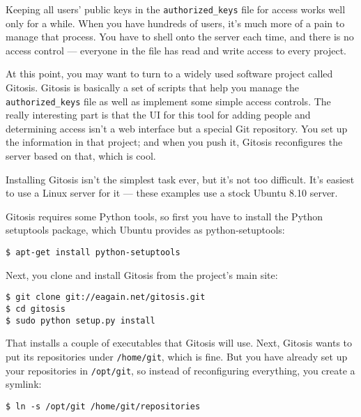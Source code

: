 \documentclass[a4paper]{book}
\newcounter{tab}[chapter]
\begin{document}
Keeping all users' public keys in the \texttt{authorized\_keys} file for access works well only for a while. When you have hundreds of users, it's much more of a pain to manage that process. You have to shell onto the server each time, and there is no access control --- everyone in the file has read and write access to every project.

At this point, you may want to turn to a widely used software project called Gitosis. Gitosis is basically a set of scripts that help you manage the \texttt{authorized\_keys} file as well as implement some simple access controls. The really interesting part is that the UI for this tool for adding people and determining access isn't a web interface but a special Git repository. You set up the information in that project; and when you push it, Gitosis reconfigures the server based on that, which is cool.

Installing Gitosis isn't the simplest task ever, but it's not too difficult. It's easiest to use a Linux server for it --- these examples use a stock Ubuntu 8.10 server.

Gitosis requires some Python tools, so first you have to install the Python setuptools package, which Ubuntu provides as python-setuptools:

\begin{shaded}\begin{verbatim}
$ apt-get install python-setuptools
\end{verbatim}\end{shaded}

Next, you clone and install Gitosis from the project's main site:

\begin{shaded}\begin{verbatim}
$ git clone git://eagain.net/gitosis.git
$ cd gitosis
$ sudo python setup.py install
\end{verbatim}\end{shaded}

That installs a couple of executables that Gitosis will use. Next, Gitosis wants to put its repositories under \texttt{/home/git}, which is fine. But you have already set up your repositories in \texttt{/opt/git}, so instead of reconfiguring everything, you create a symlink:

\begin{shaded}\begin{verbatim}
$ ln -s /opt/git /home/git/repositories
\end{verbatim}\end{shaded}
\end{document}
